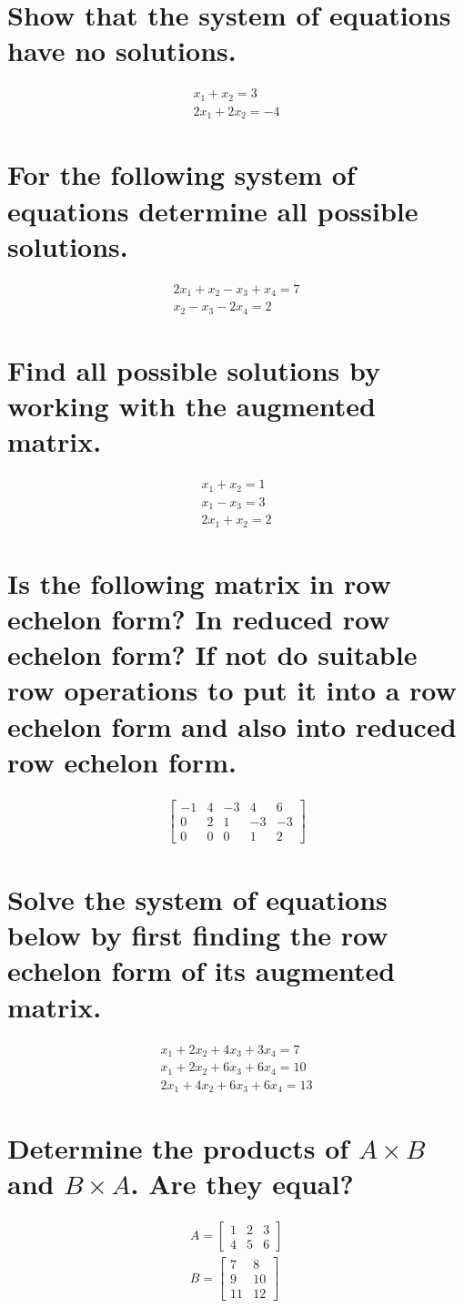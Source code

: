 \documentclass{assignment}
\begin{document}
\section{Show that the system of equations have no solutions.}
\begin{align}
  x_1 + x_2 = 3 \\
  2x_1 + 2x_2 = -4
\end{align}

\section{For the following system of equations determine all possible solutions.}
\begin{align}
  2x_1 + x_2 - x_3 + x_4 = 7 \\
  x_2 - x_3 - 2x_4 = 2 
\end{align}

\section{Find all possible solutions by working with the augmented matrix.}
\begin{align}
  x_1 + x_2 = 1 \\
  x_1 - x_3 = 3 \\
  2x_1 + x_2 = 2
\end{align}

\section{Is the following matrix in row echelon form? In reduced row echelon form? If not do suitable row operations to put it into a row echelon form and also into reduced row echelon form.}
\begin{align}
  \begin{bmatrix}
    -1 & 4 & -3 & 4 & 6 \\
    0 & 2 & 1 & -3 & -3 \\
    0 & 0 & 0 & 1 & 2
  \end{bmatrix}
\end{align}

\section{Solve the system of equations below by first finding the row echelon form of its augmented matrix.}
\begin{align}
  x_1 + 2x_2 + 4x_3 + 3x_4 = 7 \\
  x_1 + 2x_2 + 6x_3 + 6x_4 = 10 \\
  2x_1 + 4x_2 + 6x_3 + 6x_4 = 13
\end{align}

\section{Determine the products of $A \times B$ and $B \times A$. Are they equal?}
\begin{align}
  A = \begin{bmatrix}
    1 & 2 & 3 \\
    4 & 5 & 6
  \end{bmatrix} \\
  B = \begin{bmatrix}
    7 & 8 \\
    9 & 10 \\
    11 & 12
  \end{bmatrix}
\end{align}
\end{document}
